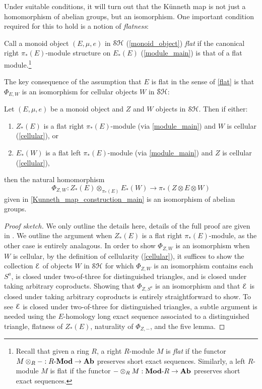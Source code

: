 \documentclass[../main.tex]{subfiles}
\begin{document}
Under suitable conditions, it will turn out that the K\"unneth map is not just a homomorphism of abelian groups, but an isomorphism. One important condition required for this to hold is a notion of \emph{flatness}:

\begin{definition}\label{flat}
    Call a monoid object $(E,\mu,e)$ in $\mathcal{SH}$ (\autoref{monoid_object}) \emph{flat} if the canonical right $\pi_*(E)$-module structure on $E_*(E)$ (\autoref{module_main}) is that of a flat module.\footnote{Recall that given a ring $R$, a right $R$-module $M$ is \emph{flat} if the functor $M\otimes_R-:R\text-\mathbf{Mod}\to\mathbf{Ab}$ preserves short exact sequences. Similarly, a left $R$-module $M$ is flat if the functor $-\otimes_RM:\mathbf{Mod}\text-R\to\mathbf{Ab}$ preserves short exact sequences.}
\end{definition}

The key consequence of the assumption that $E$ is flat in the sense of \autoref{flat} is that $\Phi_{E,W}$ is an isomorphism for cellular objects $W$ in $\mathcal{SH}$:

\begin{proposition}\label{Kunneth_map_iso_main}
	Let $(E,\mu,e)$ be a monoid object and $Z$ and $W$ objects in $\mathcal{SH}$. Then if either:\begin{enumerate}
		\item $Z_*(E)$ is a flat right $\pi_*(E)$-module (via \autoref{module_main}) and $W$ is cellular (\autoref{cellular}), or
		\item $E_*(W)$ is a flat left $\pi_*(E)$-module (via \autoref{module_main}) and $Z$ is cellular (\autoref{cellular}),
	\end{enumerate} 
	then the natural homomorphism
	\[\Phi_{Z,W}:Z_*(E)\otimes_{\pi_*(E)}E_*(W)\to \pi_*(Z\otimes E\otimes W)\]
	given in \autoref{Kunneth_map_construction_main} is an isomorphism of abelian groups.
\end{proposition}
\begin{proof}[Proof sketch]
    We only outline the details here, details of the full proof are given in . We outline the argument when $Z_*(E)$ is a flat right $\pi_*(E)$-module, as the other case is entirely analagous. In order to show $\Phi_{Z,W}$ is an isomorphism when $W$ is cellular, by the definition of cellularity (\autoref{cellular}), it suffices to show the collection $\mathcal E$ of objects $W$ in $\mathcal{SH}$ for which $\Phi_{Z,W}$ is an isomorphism contains each $S^a$, is closed under two-of-three for distinguished triangles, and is closed under taking arbitrary coproducts. Showing that $\Phi_{Z,S^a}$ is an isomorphism and that $\mathcal E$ is closed under taking arbitrary coproducts is entirely straightforward to show. To see $\mathcal E$ is closed under two-of-three for distinguished triangles, a subtle argument is needed using the $E$-homology long exact sequence associated to a distinguished triangle, flatness of $Z_*(E)$, naturality of $\Phi_{Z,-}$, and the five lemma. 
\end{proof}
\end{document}
